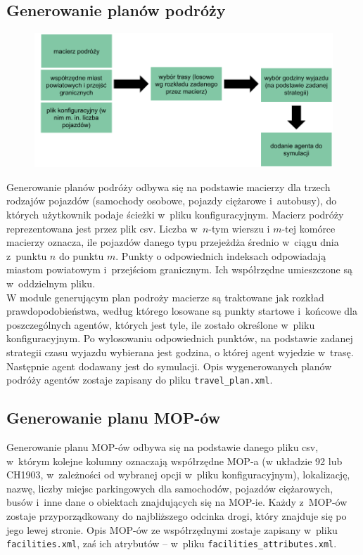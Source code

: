 \subsection{Generowanie planów podróży}
    \begin{figure}[h]
        \includegraphics[width=\textwidth]{images/mopsim/mopsim-travelplan.png}
    \end{figure}
Generowanie planów podróży odbywa się na podstawie macierzy dla trzech rodzajów pojazdów (samochody osobowe, pojazdy ciężarowe i~autobusy), do których użytkownik podaje ścieżki w~pliku konfiguracyjnym. Macierz podróży reprezentowana jest przez plik csv. Liczba w~$n$-tym wierszu i $m$-tej komórce macierzy oznacza, ile pojazdów danego typu przejeżdża średnio w~ciągu dnia z~punktu $n$ do punktu $m$. Punkty o odpowiednich indeksach odpowiadają miastom powiatowym i~przejściom granicznym. Ich współrzędne umieszczone są w~oddzielnym pliku.\\
W module generującym plan podroży macierze są traktowane jak rozkład prawdopodobieństwa, według którego losowane są punkty startowe i~końcowe dla poszczególnych agentów, których jest tyle, ile zostało określone w~pliku konfiguracyjnym. Po wylosowaniu odpowiednich punktów, na podstawie zadanej strategii czasu wyjazdu wybierana jest godzina, o której agent wyjedzie w~trasę. Następnie agent dodawany jest do symulacji. Opis wygenerowanych planów podróży agentów zostaje zapisany do pliku \texttt{travel\_plan.xml}.

\subsection{Generowanie planu MOP-ów}
Generowanie planu MOP-ów odbywa się na podstawie danego pliku csv, w~którym kolejne kolumny oznaczają współrzędne MOP-a (w układzie 92 lub CH1903, w~zależności od wybranej opcji w~pliku konfiguracyjnym), lokalizację, nazwę, liczby miejsc parkingowych dla samochodów, pojazdów ciężarowych, busów i~inne dane o obiektach znajdujących się na MOP-ie. Każdy z~MOP-ów zostaje przyporządkowany do najbliższego odcinka drogi, który znajduje się po jego lewej stronie. Opis MOP-ów ze współrzędnymi zostaje zapisany w~pliku \texttt{facilities.xml}, zaś ich atrybutów -- w~pliku \texttt{facilities\_attributes.xml}.
